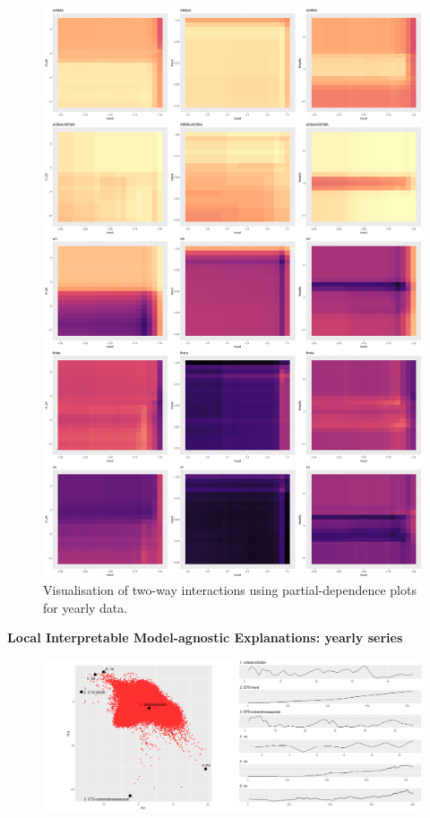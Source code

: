 \documentclass[11pt,a4paper,]{article}
\theoremstyle{definition}
\theoremstyle{definition}
\theoremstyle{definition}
\theoremstyle{remark}
\begin{document}
\begin{figure}
\centering
\includegraphics{figures/twowayinteractionyearly2-1.png}
\caption{\label{fig:twowayinteractionyearly2}Visualisation of two-way
interactions using partial-dependence plots for yearly data.}
\end{figure}

\newpage

\textbf{Local Interpretable Model-agnostic Explanations: yearly series}

\begin{figure}[h]

{\centering \includegraphics{figures/yearlylime-1} 

}

\end{figure}
\end{document}
